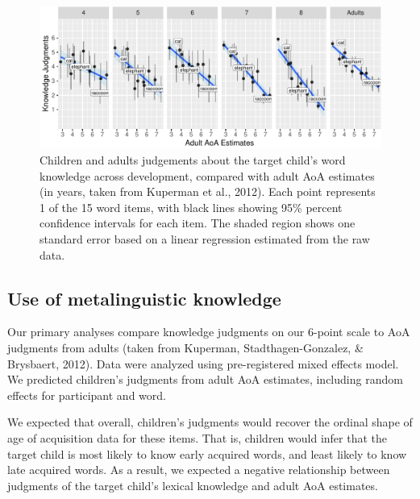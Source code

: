 \documentclass[10pt, letterpaper]{article}
\newenvironment{CodeChunk}{}{}
\begin{document}
\begin{CodeChunk}
\begin{figure}[tb]
\includegraphics{figs/development-1} \caption[Children and adults judgements about the target child's word knowledge across development, compared with adult AoA estimates (in years, taken from Kuperman et al., 2012)]{Children and adults judgements about the target child's word knowledge across development, compared with adult AoA estimates (in years, taken from Kuperman et al., 2012). Each point represents 1 of the 15 word items, with black lines showing 95\% percent confidence intervals for each item. The shaded region shows one standard error based on a linear regression estimated from the raw data.}\label{fig:development}
\end{figure}
\end{CodeChunk}

\hypertarget{use-of-metalinguistic-knowledge}{%
\subsection{Use of metalinguistic
knowledge}\label{use-of-metalinguistic-knowledge}}

Our primary analyses compare knowledge judgments on our 6-point scale to
AoA judgments from adults (taken from Kuperman, Stadthagen-Gonzalez, \&
Brysbaert, 2012). Data were analyzed using pre-registered mixed effects
model. We predicted children's judgments from adult AoA estimates,
including random effects for participant and word.

We expected that overall, children's judgments would recover the ordinal
shape of age of acquisition data for these items. That is, children
would infer that the target child is most likely to know early acquired
words, and least likely to know late acquired words. As a result, we
expected a negative relationship between judgments of the target child's
lexical knowledge and adult AoA estimates.
\end{document}

